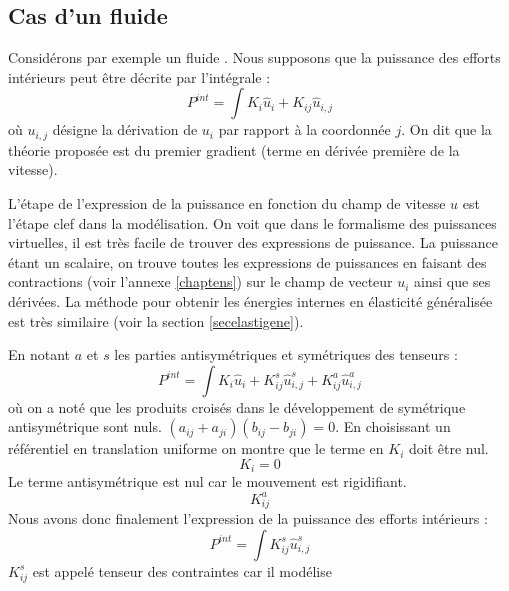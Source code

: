 \documentclass[12pt]{book}
\begin{document}
\subsection{Cas d'un fluide}\label{seccasflu}
Consid\'erons par exemple un fluide \cite{ma:equad:Dautray1}. 
Nous supposons que la puissance des efforts int\'erieurs peut \^etre
d\'ecrite par l'int\'egrale :
\begin{equation}
P^{int}=\int K_i\hat{u}_i+K_{ij}\hat{u}_{i,j}
\end{equation}
o\`u $u_{i,j}$ d\'esigne la d\'erivation de $u_i$ par rapport \`a la
coordonn\'ee $j$. 
On dit que la th\'eorie propos\'ee est du premier gradient
(terme en d\'eriv\'ee premi\`ere de la vitesse). 
\begin{rem}
L'\'etape de l'expression de la puissance en fonction du champ de
vitesse $u$ est l'\'etape clef dans la mod\'elisation. On voit que
dans le formalisme des puissances virtuelles, il est tr\`es facile de
trouver des expressions de puissance. La puissance \'etant un scalaire,
on trouve toutes les expressions de puissances en faisant des
contractions (voir l'annexe \ref{chaptens}) sur le champ de vecteur
$u_i$ ainsi que ses d\'eriv\'ees. La m\'ethode pour obtenir les
\'energies internes en \'elasticit\'e g\'en\'eralis\'ee est tr\`es
similaire (voir la section \ref{secelastigene}).
\end{rem}
En notant $a$ et $s$ les parties antisym\'etriques et sym\'etriques
des tenseurs : 
\begin{equation}
P^{int}=\int
K_i\hat{u}_i+K^{s}_{ij}\hat{u}^{s}_{i,j}+K^{a}_{ij}\hat{u}^{a}_{i,j} 
\end{equation}
o\`u on a not\'e que les produits crois\'es dans le d\'eveloppement de 
sym\'etrique antisym\'etrique sont nuls.
$(a_{ij}+a_{ji})(b_{ij}-b_{ji})=0$.
En choisissant un r\'ef\'erentiel en translation uniforme on montre
que le terme 
en $K_i$ doit \^etre nul. 
\begin{equation}
K_i=0
\end{equation}
Le terme antisym\'etrique est nul car le
mouvement est rigidifiant.
\begin{equation}
K^{a}_{ij}
\end{equation}
 Nous avons donc finalement l'expression de la puissance des efforts
int\'erieurs :
\begin{equation}
P^{int}=\int K^{s}_{ij}\hat{u}^{s}_{i,j}
\end{equation}
$K^{s}_{ij}$ est appel\'e tenseur des contraintes car il mod\'elise
\end{document}
